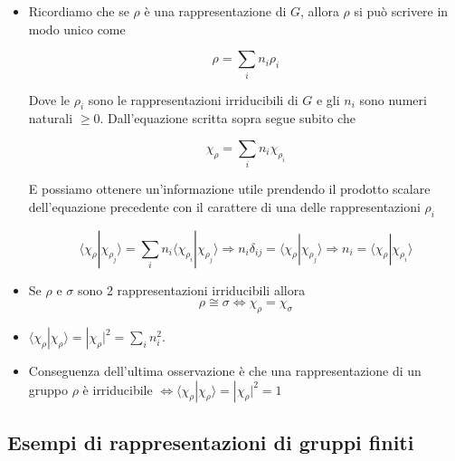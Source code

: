 \documentclass[11pt]{article}
\theoremstyle{plain}
\theoremstyle{definition}
\theoremstyle{remark}
\newcommand{\dsum}{\displaystyle\sum}
\begin{document}
\begin{itemize}
\item Ricordiamo che se $\rho$ è una rappresentazione di $G$, allora $\rho$ si può scrivere in modo unico come 

\[ \rho = \dsum_i n_i \rho_i\]

Dove le $\rho_i$ sono le rappresentazioni irriducibili di $G$ e gli $n_i$ sono numeri naturali $\geq 0$. Dall'equazione scritta sopra segue subito che

\[ \chi_\rho = \dsum_i n_i \chi_{\rho_i}\]

E possiamo ottenere un'informazione utile prendendo il prodotto scalare dell'equazione precedente con il carattere di una delle rappresentazioni $\rho_i$

\[ \langle \chi_\rho | \chi_{\rho_j} \rangle = \dsum_i n_i \langle \chi_{\rho_i} | \chi_{\rho_j} \rangle \Rightarrow n_i \delta_{ij} = \langle \chi_\rho | \chi_{\rho_j} \rangle \Rightarrow n_i = \langle \chi_\rho | \chi_{\rho_i} \rangle\]

\item Se $\rho$ e $\sigma$ sono 2 rappresentazioni irriducibili allora $$\rho \cong \sigma \Leftrightarrow \chi_{\rho}=\chi_{\sigma}$$

\item $\langle \chi_\rho | \chi_\rho \rangle = |\chi_\rho|^2 = \sum_i n_i^2$.
\item Conseguenza dell'ultima osservazione è che una rappresentazione di un gruppo $\rho$ è irriducibile $\Leftrightarrow \langle \chi_\rho | \chi_\rho \rangle = |\chi_\rho|^2 = 1$ 










\end{itemize}







\subsection{Esempi di rappresentazioni di gruppi finiti}
\end{document}
